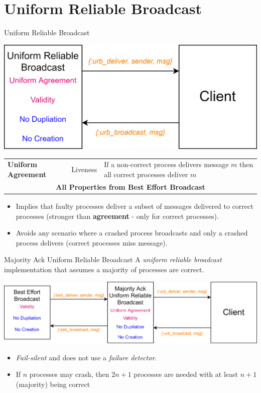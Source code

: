 \section{Uniform Reliable Broadcast}
\begin{definitionbox}{Uniform Reliable Broadcast}
    \begin{center}
        \includegraphics[width=.6\textwidth]{reliable_broadcast/images/uniform_reliable_broadcast.drawio.png}
    \end{center}
    \begin{center}
        \begin{tabular}{l l p{}}
            \textbf{Uniform Agreement} & Liveness & If a non-correct process delivers message $m$ then all correct processes deliver $m$ \\
            \multicolumn{3}{c}{\textbf{All Properties from Best Effort Broadcast}} \\
        \end{tabular}
    \end{center}
    \begin{itemize}
        \item Implies that faulty processes deliver a subset of messages delivered to correct processes (stronger than \textbf{agreement} - only for correct processes).
        \item Avoids any scenario where a crashed process broadcasts and only a crashed process delivers (correct processes miss message).
    \end{itemize}
\end{definitionbox}

\begin{definitionbox}{Majority Ack Uniform Reliable Broadcast}
    A \textit{uniform reliable broadcast} implementation that assumes a majority of processes are correct.
    \begin{center}
        \includegraphics[width=.8\textwidth]{reliable_broadcast/images/majority_ack_uniform_reliable_broadcast.drawio.png}
    \end{center}
    \begin{itemize}
        \item \textit{Fail-silent} and does not use a \textit{failure detector}.
        \item If $n$ processes may crash, then $2n+1$ processes are needed with at least $n+1$ (majority) being correct
    \end{itemize}
\end{definitionbox}
\unfinished

